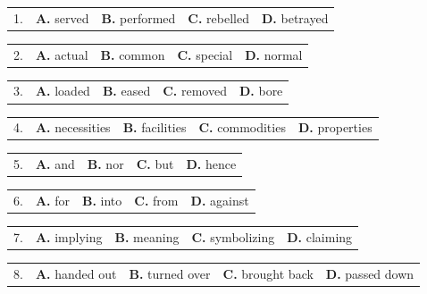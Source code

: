 \documentclass[UTF8,11pt]{ctexart}
\begin{document}
\noindent\begin{tabularx}{\linewidth}{@{}lXXXX@{}}1. & \textbf{A.} served & \textbf{B.} performed & \textbf{C.} rebelled & \textbf{D.} betrayed\\\end{tabularx}\par

\noindent\begin{tabularx}{\linewidth}{@{}lXXXX@{}}2. & \textbf{A.} actual & \textbf{B.} common & \textbf{C.} special & \textbf{D.} normal\\\end{tabularx}\par

\noindent\begin{tabularx}{\linewidth}{@{}lXXXX@{}}3. & \textbf{A.} loaded & \textbf{B.} eased & \textbf{C.} removed & \textbf{D.} bore\\\end{tabularx}\par

\noindent\begin{tabularx}{\linewidth}{@{}lXXXX@{}}4. & \textbf{A.} necessities & \textbf{B.} facilities & \textbf{C.} commodities & \textbf{D.} properties\\\end{tabularx}\par

\noindent\begin{tabularx}{\linewidth}{@{}lXXXX@{}}5. & \textbf{A.} and & \textbf{B.} nor & \textbf{C.} but & \textbf{D.} hence\\\end{tabularx}\par

\noindent\begin{tabularx}{\linewidth}{@{}lXXXX@{}}6. & \textbf{A.} for & \textbf{B.} into & \textbf{C.} from & \textbf{D.} against\\\end{tabularx}\par

\noindent\begin{tabularx}{\linewidth}{@{}lXXXX@{}}7. & \textbf{A.} implying & \textbf{B.} meaning & \textbf{C.} symbolizing & \textbf{D.} claiming\\\end{tabularx}\par

\noindent\begin{tabularx}{\linewidth}{@{}lXXXX@{}}8. & \textbf{A.} handed out & \textbf{B.} turned over & \textbf{C.} brought back & \textbf{D.} passed down\\\end{tabularx}\par
\end{document}
